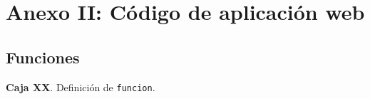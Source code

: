 \section*{Anexo II: Código de aplicación web}\label{anexo2}

\subsection*{Funciones}

\textbf{Caja XX}. Definición de \texttt{funcion}.

